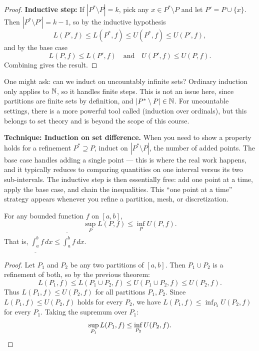 \documentclass[../master/master.tex]{subfiles}
\begin{document}
\begin{proof}
\textbf{Inductive step:} If $|P^* \setminus P| = k$, pick any $x \in P^* \setminus P$ and let $P' = P \cup \{x\}$. Then $|P^* \setminus P'| = k - 1$, so by the inductive hypothesis
\[
L(P', f) \leq L(P^*, f) \leq U(P^*, f) \leq U(P', f),
\]
and by the base case
\[
L(P, f) \leq L(P', f) \quad \text{and} \quad U(P', f) \leq U(P, f).
\]
Combining gives the result.
\end{proof}

\begin{remark}
One might ask: can we induct on uncountably infinite sets? Ordinary induction only applies to $\mathbb{N}$, so it handles finite steps. This is not an issue here, since partitions are finite sets by definition, and $|P^* \setminus P| \in \mathbb{N}$. For uncountable settings, there is a more powerful tool called  (induction over ordinals), but this belongs to set theory and is beyond the scope of this course.
\end{remark}

\begin{notebox}
\textbf{Technique: Induction on set difference.} When you need to show a property holds for a refinement $P^* \supseteq P$, induct on $|P^* \setminus P|$, the number of added points. The base case handles adding a single point --- this is where the real work happens, and it typically reduces to comparing quantities on one interval versus its two sub-intervals. The inductive step is then essentially free: add one point at a time, apply the base case, and chain the inequalities. This ``one point at a time'' strategy appears whenever you refine a partition, mesh, or discretization.
\end{notebox}

\begin{theorem}
For any bounded function $f$ on $[a,b]$,
\[
\sup_P L(P, f) \leq \inf_P U(P, f).
\]
That is, $\underline{\int_a^b} f\, dx \leq \overline{\int_a^b} f\, dx$.
\end{theorem}

\begin{proof}
Let $P_1$ and $P_2$ be any two partitions of $[a,b]$. Then $P_1 \cup P_2$ is a refinement of both, so by the previous theorem:
\[
L(P_1, f) \leq L(P_1 \cup P_2, f) \leq U(P_1 \cup P_2, f) \leq U(P_2, f).
\]
Thus $L(P_1, f) \leq U(P_2, f)$ for all partitions $P_1, P_2$. Since $L(P_1, f) \leq U(P_2, f)$ holds for every $P_2$, we have $L(P_1, f) \leq \inf_{P_2} U(P_2, f)$ for every $P_1$. Taking the supremum over $P_1$:
\[
\sup_{P_1} L(P_1, f) \leq \inf_{P_2} U(P_2, f). \qedhere
\]
\end{proof}
\end{document}
